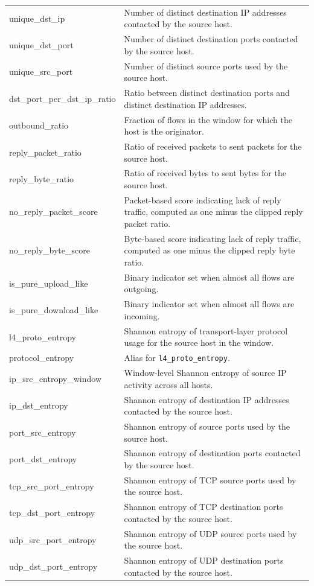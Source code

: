 \begin{longtable}{
    >{\ttfamily\raggedright\arraybackslash}p{}
    >{\raggedright\arraybackslash}p{}
}
unique\_dst\_ip & Number of distinct destination IP addresses contacted by the source host. \\
unique\_dst\_port & Number of distinct destination ports contacted by the source host. \\
unique\_src\_port & Number of distinct source ports used by the source host. \\
dst\_port\_per\_dst\_ip\_ratio & Ratio between distinct destination ports and distinct destination IP addresses. \\

outbound\_ratio & Fraction of flows in the window for which the host is the originator. \\
reply\_packet\_ratio & Ratio of received packets to sent packets for the source host. \\
reply\_byte\_ratio & Ratio of received bytes to sent bytes for the source host. \\
no\_reply\_packet\_score & Packet-based score indicating lack of reply traffic, computed as one minus the clipped reply packet ratio. \\
no\_reply\_byte\_score & Byte-based score indicating lack of reply traffic, computed as one minus the clipped reply byte ratio. \\
is\_pure\_upload\_like & Binary indicator set when almost all flows are outgoing. \\
is\_pure\_download\_like & Binary indicator set when almost all flows are incoming. \\

l4\_proto\_entropy & Shannon entropy of transport-layer protocol usage for the source host in the window. \\
protocol\_entropy & Alias for \texttt{l4\_proto\_entropy}. \\
ip\_src\_entropy\_window & Window-level Shannon entropy of source IP activity across all hosts. \\
ip\_dst\_entropy & Shannon entropy of destination IP addresses contacted by the source host. \\
port\_src\_entropy & Shannon entropy of source ports used by the source host. \\
port\_dst\_entropy & Shannon entropy of destination ports contacted by the source host. \\
tcp\_src\_port\_entropy & Shannon entropy of TCP source ports used by the source host. \\
tcp\_dst\_port\_entropy & Shannon entropy of TCP destination ports contacted by the source host. \\
udp\_src\_port\_entropy & Shannon entropy of UDP source ports used by the source host. \\
udp\_dst\_port\_entropy & Shannon entropy of UDP destination ports contacted by the source host. \\


\end{longtable}
